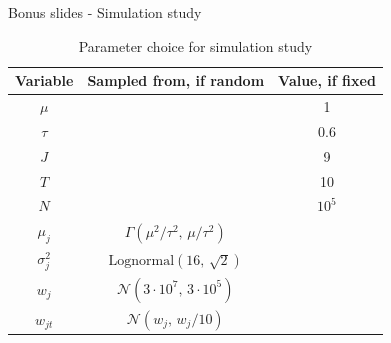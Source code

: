 \documentclass{beamer}
\begin{document}
\begin{frame}{Bonus slides - Simulation study}

\begin{table}[H]
\centering
\caption{Parameter choice for simulation study}
\label{tab:parameters}
\begin{tabular}{ccc}
\hline
Variable     & Sampled from, if random  & Value, if fixed \\ \hline
$\mu$ && 1 \\
$\tau$ && 0.6 \\
$J$ && 9 \\
$T$ && 10 \\
$N$ && $10^5$ \\
$\mu_j$ & $\Gamma (\mu^2/\tau^2,\, \mu/\tau^2)$ &\\
$\sigma_j^2$ &  $\text{Lognormal}(16,\, \sqrt{2})$ &\\
$w_j$ & $\mathcal{N}(3\cdot 10^7,\, 3\cdot 10^5)$ &\\
$w_{jt}$ & $\mathcal{N}(w_j,\, w_j/10)$& \\
\hline
\end{tabular}
\end{table}
    
\end{frame}
\end{document}

